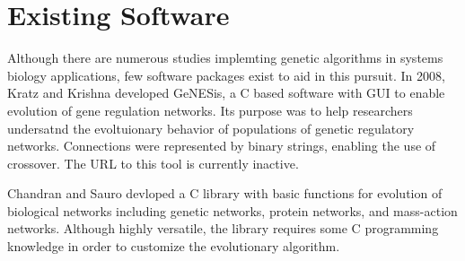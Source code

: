 \documentclass[12pt]{report}
\begin{document}
\section{Existing Software}

Although there are numerous studies implemting genetic algorithms in systems biology applications, few software packages exist to aid in this pursuit. In 2008, Kratz and Krishna developed GeNESis, a C based software with GUI to enable evolution of gene regulation networks. Its purpose was to help researchers undersatnd the evoltuionary behavior of populations of genetic regulatory networks. Connections were represented by binary strings, enabling the use of crossover. The URL to this tool is currently inactive.

Chandran and Sauro devloped a C library with basic functions for evolution of biological networks including genetic networks, protein networks, and mass-action networks. Although highly versatile, the library requires some C programming knowledge in order to customize the evolutionary algorithm.
\end{document}
